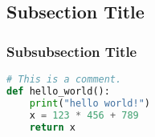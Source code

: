 \subsection{Subsection Title}
\lipsum[4]

\subsubsection{Subsubsection Title}
\lipsum[5-6]

\begin{lstlisting}[language=python]
# This is a comment.
def hello_world():
    print("hello world!")
    x = 123 * 456 + 789
    return x
\end{lstlisting}

\lipsum[7-8]

